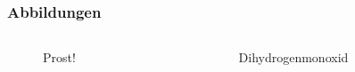 \begin{frame}
\frametitle{Abbildungen}

\begin{columns}
\begin{column}{0.47\textwidth}
\begin{figure}
\caption{Prost!}
\end{figure}
\end{column}
\begin{column}{0.47\textwidth}
\begin{figure}
\caption{Dihydrogenmonoxid}
\end{figure}
\end{column}
\end{columns}
\end{frame}
